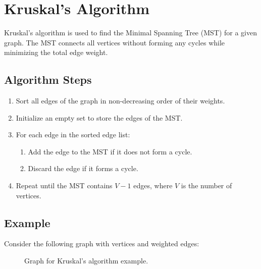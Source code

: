 \documentclass{article}
\begin{document}
\section*{Kruskal's Algorithm}

Kruskal's algorithm is used to find the Minimal Spanning Tree (MST) for a given graph. The MST connects all vertices without forming any cycles while minimizing the total edge weight.

\subsection*{Algorithm Steps}
\begin{enumerate}
    \item Sort all edges of the graph in non-decreasing order of their weights.
    \item Initialize an empty set to store the edges of the MST.
    \item For each edge in the sorted edge list:
    \begin{enumerate}
        \item Add the edge to the MST if it does not form a cycle.
        \item Discard the edge if it forms a cycle.
    \end{enumerate}
    \item Repeat until the MST contains \( V - 1 \) edges, where \( V \) is the number of vertices.
\end{enumerate}

\subsection*{Example}

Consider the following graph with vertices and weighted edges:

\begin{figure}[h]
    \centering
    \caption{Graph for Kruskal's algorithm example.}
\end{figure}
\end{document}
